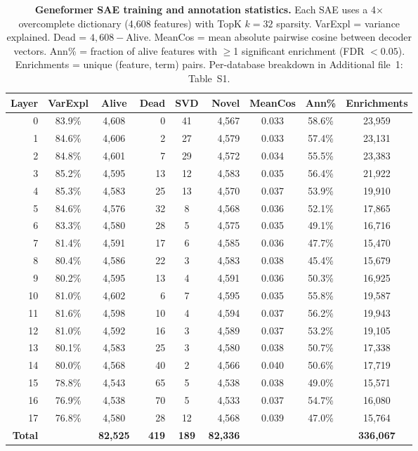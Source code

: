 \documentclass[onecolumn]{article}
\begin{document}
\begin{table}[t]
\centering
\caption{\textbf{Geneformer SAE training and annotation statistics.} Each SAE uses a 4$\times$ overcomplete dictionary (4,608 features) with TopK $k{=}32$ sparsity. VarExpl = variance explained. Dead = $4{,}608 - \text{Alive}$. MeanCos = mean absolute pairwise cosine between decoder vectors. Ann\% = fraction of alive features with $\geq$1 significant enrichment (FDR $< 0.05$). Enrichments = unique (feature, term) pairs. Per-database breakdown in Additional file~1: Table~S1.}
\label{tab:full18}
\smallskip
\begin{tabular}{rccrcrccc}
\toprule
Layer & VarExpl & Alive & Dead & SVD & Novel & MeanCos & Ann\% & Enrichments \\
\midrule
0  & 83.9\% & 4,608 & 0   & 41 & 4,567 & 0.033 & 58.6\% & 23,959 \\
1  & 84.6\% & 4,606 & 2   & 27 & 4,579 & 0.033 & 57.4\% & 23,131 \\
2  & 84.8\% & 4,601 & 7   & 29 & 4,572 & 0.034 & 55.5\% & 23,383 \\
3  & 85.2\% & 4,595 & 13  & 12 & 4,583 & 0.035 & 56.4\% & 21,922 \\
4  & 85.3\% & 4,583 & 25  & 13 & 4,570 & 0.037 & 53.9\% & 19,910 \\
5  & 84.6\% & 4,576 & 32  & 8  & 4,568 & 0.036 & 52.1\% & 17,865 \\
6  & 83.3\% & 4,580 & 28  & 5  & 4,575 & 0.035 & 49.1\% & 16,716 \\
7  & 81.4\% & 4,591 & 17  & 6  & 4,585 & 0.036 & 47.7\% & 15,470 \\
8  & 80.4\% & 4,586 & 22  & 3  & 4,583 & 0.038 & 45.4\% & 15,679 \\
9  & 80.2\% & 4,595 & 13  & 4  & 4,591 & 0.036 & 50.3\% & 16,925 \\
10 & 81.0\% & 4,602 & 6   & 7  & 4,595 & 0.035 & 55.8\% & 19,587 \\
11 & 81.6\% & 4,598 & 10  & 4  & 4,594 & 0.037 & 56.2\% & 19,943 \\
12 & 81.0\% & 4,592 & 16  & 3  & 4,589 & 0.037 & 53.2\% & 19,105 \\
13 & 80.1\% & 4,583 & 25  & 3  & 4,580 & 0.038 & 50.7\% & 17,338 \\
14 & 80.0\% & 4,568 & 40  & 2  & 4,566 & 0.040 & 50.6\% & 17,719 \\
15 & 78.8\% & 4,543 & 65  & 5  & 4,538 & 0.038 & 49.0\% & 15,571 \\
16 & 76.9\% & 4,538 & 70  & 5  & 4,533 & 0.037 & 54.7\% & 16,080 \\
17 & 76.8\% & 4,580 & 28  & 12 & 4,568 & 0.039 & 47.0\% & 15,764 \\
\midrule
\textbf{Total} & & \textbf{82,525} & \textbf{419} & \textbf{189} & \textbf{82,336} & & & \textbf{336,067} \\
\bottomrule
\end{tabular}
\end{table}
\end{document}

